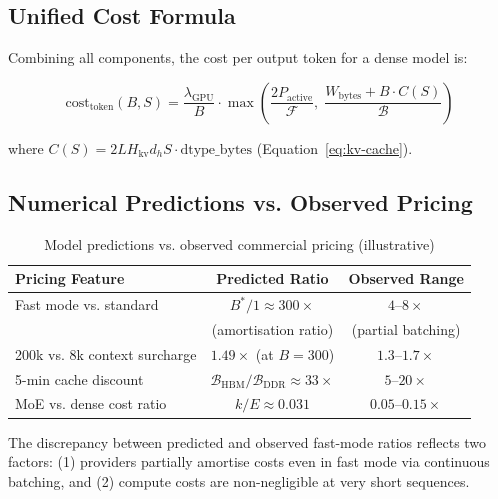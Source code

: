 \documentclass[11pt,a4paper]{article}
\newcommand{\BW}{\mathcal{B}}
\newcommand{\FLOPS}{\mathcal{F}}
\begin{document}
\subsection{Unified Cost Formula}

Combining all components, the cost per output token for a dense model is:

\begin{equation}
  \text{cost}_\text{token}(B, S) = \frac{\lambda_\text{GPU}}{B} \cdot
  \max\!\left(
    \frac{2 P_\text{active}}{\FLOPS},\;
    \frac{W_\text{bytes} + B \cdot C(S)}{\BW}
  \right)
  \label{eq:unified-cost}
\end{equation}

where $C(S) = 2 L H_\text{kv} d_h S \cdot \text{dtype\_bytes}$
(Equation~\ref{eq:kv-cache}).

\subsection{Numerical Predictions vs. Observed Pricing}

\begin{table}[h]
\centering
\caption{Model predictions vs. observed commercial pricing (illustrative)}
\label{tab:predictions}
\begin{tabular}{lcc}
\toprule
\textbf{Pricing Feature}        & \textbf{Predicted Ratio} & \textbf{Observed Range} \\
\midrule
Fast mode vs. standard          & $B^* / 1 \approx 300\times$  & $4$--$8\times$  \\
                                & (amortisation ratio)      & (partial batching)\\
200k vs. 8k context surcharge   & $1.49\times$ (at $B=300$) & $1.3$--$1.7\times$ \\
5-min cache discount            & $\BW_\text{HBM}/\BW_\text{DDR} \approx 33\times$ & $5$--$20\times$ \\
MoE vs. dense cost ratio        & $k/E \approx 0.031$       & $0.05$--$0.15\times$ \\
\bottomrule
\end{tabular}
\end{table}

The discrepancy between predicted and observed fast-mode ratios reflects
two factors: (1) providers partially amortise costs even in fast mode via
continuous batching, and (2) compute costs are non-negligible at very short
sequences.

\end{document}

